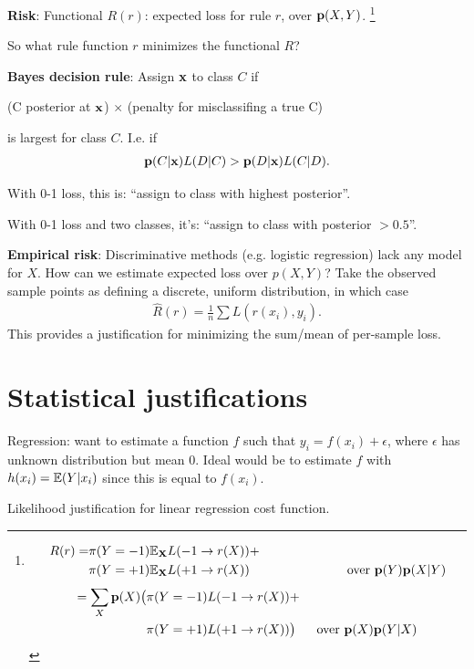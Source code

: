 \textbf{Risk}: Functional $R(r)$: expected loss for rule $r$, over $\mathbf{p}(X, Y)$.
\footnote{
\begin{align*}
  R(r) = &\pi(Y=-1){\mathbb E}_\mathbf X L(-1 \to r(X)) + \\
         &\pi(Y=+1){\mathbb E}_\mathbf X L(+1 \to r(X))~~~~~~~~~~~~~~~~~~~~~~~\text{over $\mathbf{p}(Y)\mathbf{p}(X|Y)$}
\end{align*}
\begin{align*}
  = \sum_X \mathbf{p}(X)\big(&\pi(Y=-1)L(-1 \to r(X)) + \\
                     &\pi(Y=+1)L(+1 \to r(X))\big)~~~~~\text{over $\mathbf{p}(X)\mathbf{p}(Y|X)$}
\end{align*}
}

So what rule function $r$ minimizes the functional $R$?

\textbf{Bayes decision rule}: Assign $\mathbf x$ to class $C$ if

\begin{center}
(C posterior at $\mathbf x$) $\times$ (penalty for misclassifing a true C)
\end{center}

is largest for class $C$. I.e. if
\begin{align*}
  \mathbf{p}(C|\mathbf x)L(D|C) > \mathbf{p}(D|\mathbf x)L(C|D).
\end{align*}

With 0-1 loss, this is: ``assign to class with highest posterior''.

With 0-1 loss and two classes, it's: ``assign to class with posterior $> 0.5$''.

\textbf{Empirical risk}: Discriminative methods (e.g. logistic regression) lack
any model for $X$. How can we estimate expected loss over $p(X,Y)$? Take the
observed sample points as defining a discrete, uniform distribution, in which
case
\begin{align*}
  \hat R(r) = \frac{1}{n}\sum L(r(x_i), y_i).
\end{align*}
This provides a justification for minimizing the sum/mean of per-sample loss.

\newpage
\section{Statistical justifications}

Regression: want to estimate a function $f$ such that
$y_i = f(x_i) + \epsilon$, where $\epsilon$ has unknown distribution but mean
0. Ideal would be to estimate $f$ with $h(x_i) = {\mathbb E}(Y|x_i)$ since this is equal
to $f(x_i)$.

Likelihood justification for linear regression cost function.

